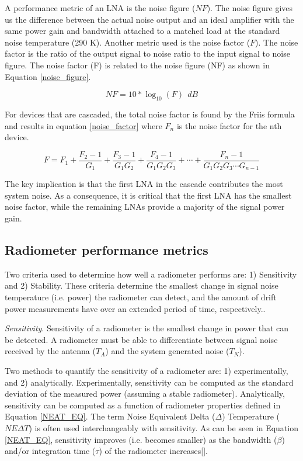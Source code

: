 A performance metric of an LNA is the noise figure ($NF$).  The noise figure gives us the difference between the actual noise output and an ideal amplifier with the same power gain and bandwidth attached to a matched load at the standard noise temperature (290 K).  Another metric used is the noise factor ($F$).  The noise factor is the ratio of the output signal to noise ratio to the input signal to noise figure.  The noise factor (F) is related to the noise figure (NF) as shown in Equation \ref{noise_figure}.

\begin{equation}\label{noise_figure}
NF=10 * \log_{10}(F)\ \ dB
\end{equation}

For devices that are cascaded, the total noise factor is found by the Friis formula and results in equation \ref{noise_factor} where $F_n$ is the noise factor for the nth device.  

\begin{equation}\label{noise_factor}
F=F_1+\frac{F_2-1}{G_1}+\frac{F_3-1}{G_1 G_2}+\frac{F_4-1}{G_1 G_2 G_3}+\cdots +\frac{F_n-1}{G_1 G_2 G_3 \cdots G_{n-1}}
\end{equation}

The key implication is that the first LNA in the cascade contributes the most system noise.  As a consequence, it is critical that the first LNA has the smallest noise factor, while the remaining LNAs provide a majority of the signal power gain.

\subsection{Radiometer performance metrics}\label{performance_metrics}

Two criteria used to determine how well a radiometer performs are: 1) Sensitivity and 2) Stability.  These criteria determine the smallest change in signal noise temperature (i.e. power) the radiometer can detect, and the amount of drift power measurements have over an extended period of time, respectively..

\emph{Sensitivity}.  Sensitivity of a radiometer is the smallest change in power that can be detected.  A radiometer must be able to differentiate between signal noise received by  the antenna ($T_{A}$) and the system generated noise ($T_N$).

Two methods to quantify the sensitivity of a radiometer are: 1) experimentally, and 2) analytically.  Experimentally, sensitivity can be computed as the standard deviation of the measured power (assuming a stable radiometer).  Analytically, sensitivity can be computed as a function of radiometer properties defined in Equation \ref{NEAT_EQ}.  The term Noise Equivalent Delta ($\Delta$) Temperature ($NE\Delta T$) is often used interchangeably with sensitivity.  As can be seen in Equation \ref{NEAT_EQ}, sensitivity improves (i.e. becomes smaller) as the bandwidth ($\beta$) and/or integration time ($\tau$) of the radiometer increases[\cite{ulaby}].

